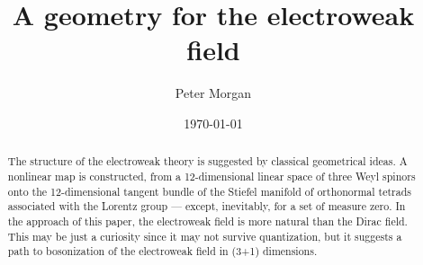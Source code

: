 \documentclass[a4paper,twocolumn,showpacs,preprintnumbers,aps]{revtex4}
\begin{document}
\title{A geometry for the electroweak field}
\author{Peter Morgan}

\date{\today}
\begin{abstract}
The structure of the electroweak theory is suggested by classical
geometrical ideas. A nonlinear map is constructed,
from a 12-dimensional linear space of three Weyl spinors onto the
12-dimensional tangent bundle of the Stiefel manifold of orthonormal
tetrads associated with the Lorentz group --- except, inevitably, for a
set of measure zero. In the approach of this paper, the electroweak field
is more natural than the Dirac field. This may be just a curiosity since it
may not survive quantization, but it suggests a path to bosonization of
the electroweak field in (3+1) dimensions.
\end{abstract}

\maketitle

\providecommand\RR{{\mathrm{I\hspace{-.2em}R}}}
\providecommand\HH{{\mathrm{H\hspace{-.65em}H}}}
\providecommand\ZZ{{Z\hspace{-.45em}Z}}
\providecommand\LL{{\sqrt{(\overline{\psi}\psi)^2+(\overline{\psi}\gamma^{0123}\psi)^2}}}
\providecommand\TZ {{T\hspace{-.35em}Z}}
\end{document}
